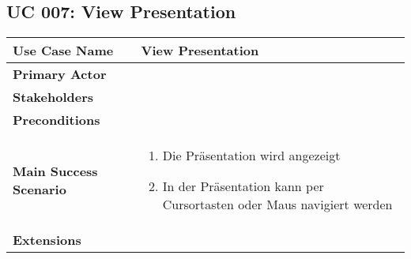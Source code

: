 \subsection{UC 007: View Presentation}
\label{uc:007-view-pres}

\begin{tabular}{|l|p{}|}
\hline
\textbf{Use Case Name} 	&	View Presentation	\\ \hline
\textbf{Primary Actor} 	&		\\ \hline
\textbf{Stakeholders}	&		\\ \hline
\textbf{Preconditions}	&		\\ \hline
\textbf{Main Success Scenario}	&
\begin{enumerate}
	\item Die Präsentation wird angezeigt
	\item In der Präsentation kann per Cursortasten oder Maus navigiert werden
\end{enumerate}
\\ \hline
\textbf{Extensions}	& 	\\ \hline
\end{tabular}
